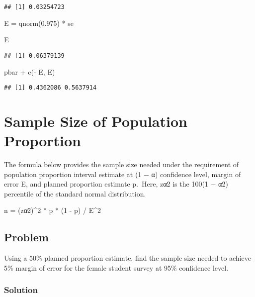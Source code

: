 \documentclass[
]{article}
\newenvironment{Shaded}{\begin{snugshade}}{\end{snugshade}}
\newcommand{\FloatTok}[1]{\textcolor[rgb]{0.00,0.00,0.81}{#1}}
\newcommand{\FunctionTok}[1]{\textcolor[rgb]{0.00,0.00,0.00}{#1}}
\newcommand{\NormalTok}[1]{#1}
\newcommand{\OtherTok}[1]{\textcolor[rgb]{0.56,0.35,0.01}{#1}}
\newcommand{\SpecialCharTok}[1]{\textcolor[rgb]{0.00,0.00,0.00}{#1}}
\begin{document}
\begin{verbatim}
## [1] 0.03254723
\end{verbatim}

\begin{Shaded}
\begin{Highlighting}[]
\NormalTok{E }\OtherTok{=} \FunctionTok{qnorm}\NormalTok{(}\FloatTok{0.975}\NormalTok{) }\SpecialCharTok{*}\NormalTok{ se}

\NormalTok{E}
\end{Highlighting}
\end{Shaded}

\begin{verbatim}
## [1] 0.06379139
\end{verbatim}

\begin{Shaded}
\begin{Highlighting}[]
\NormalTok{pbar }\SpecialCharTok{+} \FunctionTok{c}\NormalTok{(}\SpecialCharTok{{-}}\NormalTok{ E, E)}
\end{Highlighting}
\end{Shaded}

\begin{verbatim}
## [1] 0.4362086 0.5637914
\end{verbatim}

\hypertarget{sample-size-of-population-proportion}{%
\section{Sample Size of Population
Proportion}\label{sample-size-of-population-proportion}}

The formula below provides the sample size needed under the requirement
of population proportion interval estimate at (1 − α) confidence level,
margin of error E, and planned proportion estimate p.~Here, zα∕2 is the
100(1 − α∕2) percentile of the standard normal distribution.

n = (zα∕2)\^{}2 * p * (1 - p) / E\^{}2

\hypertarget{problem-9}{%
\subsection{Problem}\label{problem-9}}

Using a 50\% planned proportion estimate, find the sample size needed to
achieve 5\% margin of error for the female student survey at 95\%
confidence level.

\hypertarget{solution-11}{%
\subsubsection{Solution}\label{solution-11}}
\end{document}
